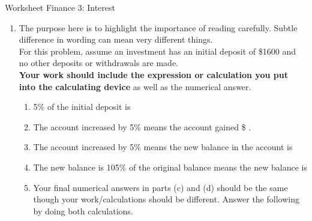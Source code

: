 \documentclass[12pt]{article}
\begin{document}
\begin{center}
{\Large  Worksheet Finance 3: Interest}
\end{center}






\begin{enumerate}
\item The purpose here is to highlight the importance of reading carefully. Subtle difference in wording can mean very different things.\\

For this problem, assume an investment has an initial deposit of \$1600 and no other deposits or withdrawals are made. \\

\textbf{Your work should include the expression or calculation you put into the calculating device } as well as the numerical answer.
	\begin{enumerate}
	\item 5\% of the initial deposit is \\
	
	\vfill
	
	\item The account increased by 5\% means the account gained \$ {\hrulefill}.\\
	
	\vfill

	
	\item The account increased by 5\% means the new balance in the account is \\
	
	\vfill

	
	
	\item The new balance is 105\% of the original balance means the new balance is \\
	
	\vfill

	
	
	\item Your final numerical answers in parts (c) and (d) should be the same though your work/calculations should be different. Answer the following by doing both calculations.\\
	

\end{enumerate}
\end{enumerate}
\end{document}
